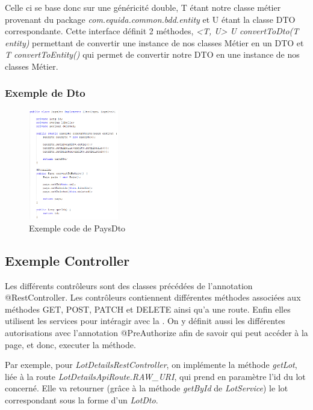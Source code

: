 				\noindent
				Celle ci se base donc sur une généricité double, T étant notre classe métier provenant du package \textit{com.equida.common.bdd.entity} et U étant la classe DTO correspondante. Cette interface définit 2 méthodes, \textit{<T, U> U convertToDto(T entity)} permettant de convertir une instance de nos classes Métier en un DTO et \textit{T convertToEntity()} qui permet de convertir notre DTO en une instance de nos classes Métier.

			\subsubsection{Exemple de Dto}

			\begin{figure}[H]
				\centering\includegraphics[width=0.35\textwidth, keepaspectratio]{res/paysDto.png}
				\caption{Exemple code de PaysDto}
			\end{figure}

		\newpage
		\subsection{Exemple Controller}

			Les différents contrôleurs sont des classes précédées de l'annotation @RestController. \newline
			Les contrôleurs contiennent différentes méthodes associées aux méthodes GET, POST, PATCH et DELETE ainsi qu'a une route. Enfin elles utilisent les services pour intéragir avec la \bdd{}. On y définit aussi les différentes autorisations avec l'annotation @PreAuthorize afin de savoir qui peut accéder à la page, et donc, executer la méthode.

			\noindent
			Par exemple, pour \textit{LotDetailsRestController}, on implémente la méthode \textit{getLot}, liée à la route \textit{LotDetailsApiRoute.RAW\_URI}, qui prend en paramètre l'id du lot concerné. Elle va retourner (grâce à la méthode \textit{getById} de \textit{LotService}) le lot correspondant sous la forme d'un \textit{LotDto}.

